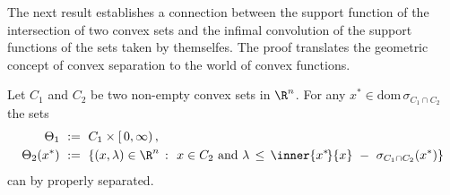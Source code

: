 The next result establishes a connection between the support function of the intersection of two convex sets and the infimal convolution of the support functions of the sets taken by themselfes.
The proof translates the geometric concept of convex separation to the world of convex functions.

\begin{lemma}
  \label{cv:primer:lem}
  Let $C_1$ and $C_2$ be two non-empty convex sets in $\R^n$.
  For any
  $ x^* \in \mathrm{dom}\, \sigma_{C_1\cap C_2} $
  the sets
  \begin{align*}
    \Theta_1
    &
    \ :=\ 
    C_1 \times [\,0,\infty)
    \,,
    \\
    \Theta_2
    (x^*)
    &
    \ :=\ 
    \left\{ 
      (x,\lambda)\in \R^n
      \ 
      \colon
      \ 
      x \in C_2
      \ 
      \text{and}
      \ 
      \lambda
      \,
      \le
      \,
      \inner{x^*\!}{x} 
      \ 
      -
      \ 
      \sigma_{C_1\cap C_2}(x^*)
    \right\}
  \end{align*}
  can by properly separated.
\end{lemma}
